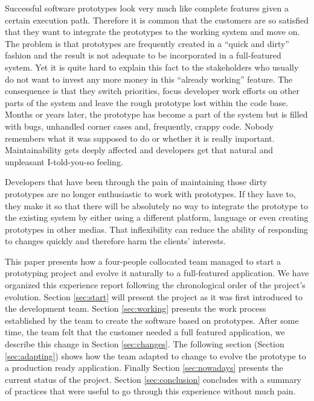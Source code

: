 \documentclass[lnbip]{svmultln}
\begin{document}
Successful software prototypes look very much like complete features
given a certain execution path. Therefore it is common that the
customers are so satisfied that they want to integrate the prototypes
to the working system and move on. The problem is that prototypes are
frequently created in a ``quick and dirty'' fashion and the result is
not adequate to be incorporated in a full-featured system. Yet it is
quite hard to explain this fact to the stakeholders who usually do not
want to invest any more money in this ``already working'' feature. The
consequence is that they switch priorities, focus developer work
efforts on other parts of the system and leave the rough prototype
lost within the code base. Months or years later, the prototype has
become a part of the system but is filled with bugs, unhandled corner
cases and, frequently, crappy code. Nobody remembers what it was
supposed to do or whether it is really important. Maintainability gets
deeply affected and developers get that natural and unpleasant
I-told-you-so feeling. %

Developers that have been through the pain of maintaining those dirty
prototypes are no longer enthusiastic to work with prototypes. If they
have to, they make it so that there will be absolutely no way to
integrate the prototype to the existing system by either using a
different platform, language or even creating prototypes in other
medias. That inflexibility can reduce the ability of responding to
changes quickly and therefore harm the clients' interests.

This paper presents how a four-people collocated team managed to start
a prototyping project and evolve it naturally to a full-featured
application.  We have organized this experience report following the
chronological order of the project's evolution. Section
\ref{sec:start} will present the project as it was first introduced to
the development team. Section \ref{sec:working} presents the work
process established by the team to create the software based on
prototypes. After some time, the team felt that the customer needed a
full featured application, we describe this change in Section
\ref{sec:changes}. The following section (Section \ref{sec:adapting})
shows how the team adapted to change to evolve the prototype to a
production ready application. Finally Section \ref{sec:nowadays}
presents the current status of the project. Section
\ref{sec:conclusion} concludes with a summary of practices that were
useful to go through this experience without much pain.
\end{document}
